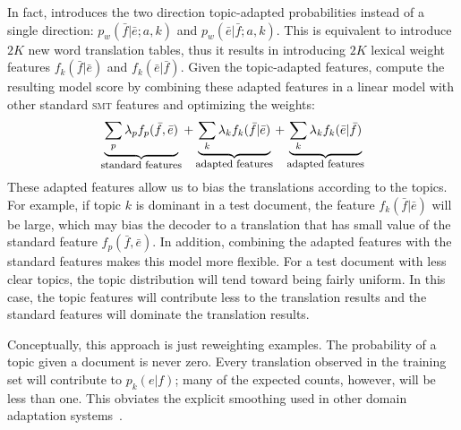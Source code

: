 In fact, \citet{Eidelman-12} introduces the two direction topic-adapted probabilities instead of a single direction: $p_w(\bar{f} | \bar{e};a, k)$ and $p_w(\bar{e} | \bar{f};a, k)$. This is equivalent to introduce $2K$ new word translation tables, thus it results in introducing $2K$ lexical weight features $f_{k}(\bar{f}|\bar{e})$ and $f_{k}(\bar{e}|\bar{f})$. Given the topic-adapted features, \citet{Eidelman-12} compute the resulting model score by combining these adapted features in a linear model with other standard \textsc{smt} features and optimizing the weights:
\begin{align}
\explain{standard features}{\sum_p \lambda_p f_p(\bar{f},\bar{e})} + \explain{adapted features}{\sum_k \lambda_k f_k(\bar{f} | \bar{e})} + \explain{adapted features}{\sum_k \lambda_k f_k(\bar{e} | \bar{f})}
\end{align}
These adapted features allow us to bias the translations according to the topics. For example, if topic $k$ is dominant in a test document, the feature $f_k(\bar{f} | \bar{e})$ will be large, which may bias the decoder to a translation that has small value of the standard feature $f_p(\bar{f}, \bar{e})$. In addition, combining the adapted features with the standard features makes this model more flexible. For a test document with less clear topics, the topic distribution will tend toward being fairly uniform. In this case, the topic features will contribute less to the translation results and the standard features will dominate the translation results.

Conceptually, this approach is just reweighting examples.  The probability of a topic given a document is never zero.  Every translation observed in the training set will contribute to $p_{k}(e|f)$; many of the expected counts, however, will be less than one.  This obviates the explicit smoothing used in other domain adaptation systems~\citep{chiang-11}.


